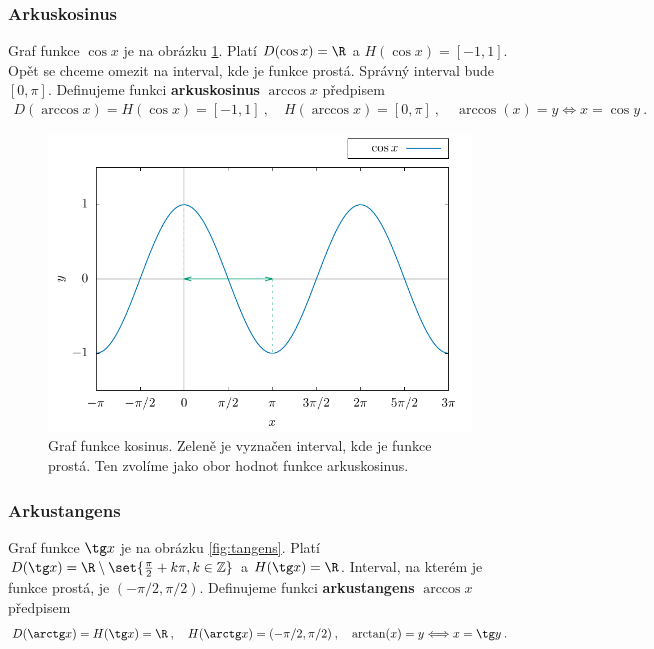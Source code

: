 \subsubsection*{Arkuskosinus}

Graf funkce $\cos x$ je na obrázku \ref{fig:kosinus}. Platí $D(\cos x) = \R$ a $H(\cos x) = [-1,1]$. Opět se chceme omezit na interval, kde je funkce prostá. Správný interval bude $[0,\pi]$. Definujeme funkci \textbf{arkuskosinus} $\arccos x$ předpisem \begin{align}
    D(\arccos x) = H(\cos x) = [-1,1] \:, \quad H(\arccos x) = [0, \pi] \:, \quad \arccos(x) = y \Longleftrightarrow x = \cos y \:.
\end{align}

\begin{figure}[H]
    \centering
    \includegraphics{Gnuplot/cv1/Figures/cosinusgraf.pdf}
    \caption{Graf funkce kosinus. Zeleně je vyznačen interval, kde je funkce prostá. Ten zvolíme jako obor hodnot funkce arkuskosinus.}
    \label{fig:kosinus}
\end{figure}

\subsubsection*{Arkustangens}

Graf funkce $\tg x$ je na obrázku \ref{fig:tangens}. Platí $D(\tg x) = \R \setminus \set{\frac{\pi}{2}+ k \pi, k \in \mathbb{Z}}$ a $H(\tg x) = \R$. Interval, na kterém je funkce prostá, je $(-\pi/2, \pi/2)$. Definujeme funkci \textbf{arkustangens} $\arccos x$ předpisem \begin{align}
    D(\arctg x) = H(\tg x) = \R \:, \quad H(\arctg x) = (-\pi/2, \pi/2) \:, \quad \arctan(x) = y \Longleftrightarrow x = \tg y \:.
\end{align}

